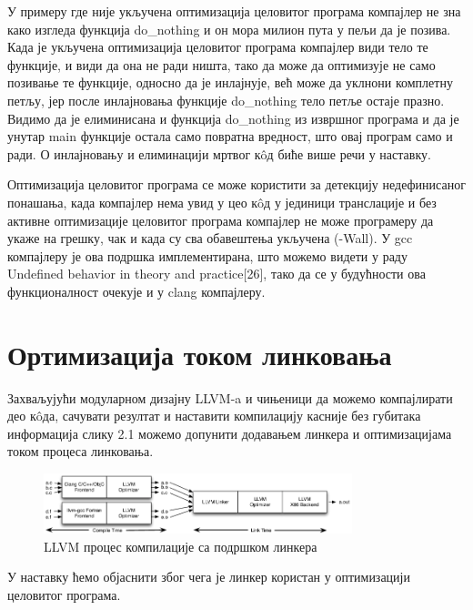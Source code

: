 \documentclass[12pt,oneside]{memoir}
\begin{document}
У примеру где није укључена оптимизација целовитог програма компајлер не зна како
изгледа функција do{\_}nothing и он мора милион пута у пељи да је позива.
Када је укључена оптимизација целовитог програма компајлер види тело те функције,
и види да она не ради ништа, тако да може да оптимизује не само позивање те функције,
односно да је инлајнује, већ може да уклнони комплетну петљу, јер после инлајновања
функције do{\_}nothing тело петље остаје празно.
Видимо да је елиминисана и функција do{\_}nothing из извршног програма и да је унутар
main функције остала само повратна вредност, што овај програм само и ради.
О инлајновању и елиминацији мртвог к\^{o}д биће више речи у наставку.

Оптимизација целовитог програма се може користити за детекцију недефинисаног
понашања, када компајлер нема увид у цео к\^{o}д у јединици транслације и без
активне оптимизације целовитог програма компајлер не може програмеру да укаже
на грешку, чак и када су сва обавештења укључена (-Wall).
У gcc компајлеру је ова подршка имплементирана, што можемо видети у раду
Undefined behavior in theory and practice[26], тако да се у будућности ова
функционалност очекује и у clang компајлеру.

\section{Ортимизација током линковања}


Захваљујући модуларном дизајну LLVM-a и чињеници да можемо компајлирати део к\^{o}да,
сачувати резултат и наставити компилацију касније без губитака информација
слику 2.1 можемо допунити додавањем линкера и оптимизацијама током процеса линковања.

\begin{figure}[!ht]
  \centering
  \includegraphics[width=0.8\textwidth]{LTO.png}
  \caption{LLVM процес компилације са подршком линкера}
  \label{fig:grafikon}
\end{figure}


У наставку ћемо објаснити због чега је линкер користан у оптимизацији целовитог програма.
\end{document}
